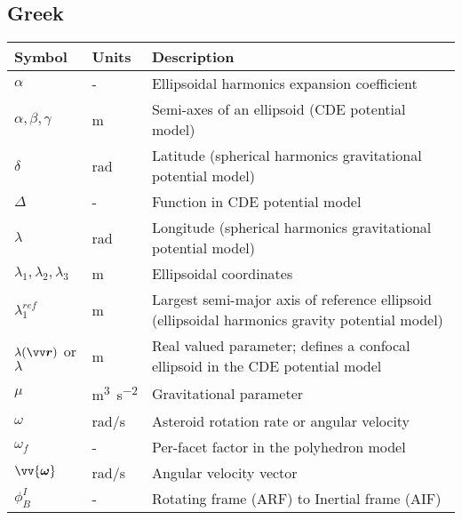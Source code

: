 \subsection*{Greek}
\begin{longtable}[l]{p{100pt} p{70pt} p{250pt}}
    \textbf{Symbol} & \textbf{Units} & \textbf{Description}                                 \\
    \hline
    $\alpha$            & -               & Ellipsoidal harmonics expansion coefficient     \\
    $\alpha, \beta, \gamma$ & m           & Semi-axes of an ellipsoid
                                            (CDE potential model)                           \\
    $\delta$            & rad             & Latitude (spherical harmonics
                                            gravitational potential model)                  \\
    $\Delta$            & -               & Function in CDE potential model                 \\
    $\lambda$           & rad             & Longitude (spherical harmonics
                                            gravitational potential model)                  \\
    $\lambda_1, \lambda_2, \lambda_3$ & m & Ellipsoidal coordinates                         \\
    $\lambda_1^{ref}$   & m               & Largest semi-major axis of reference ellipsoid
                                            (ellipsoidal harmonics gravity potential model) \\
    $\lambda(\bvector{r})$ or $\lambda$ & m & Real valued parameter; defines a confocal
                                              ellipsoid in the CDE potential model          \\
    $\mu$               & \si{\metre\cubed\per\second\squared}       & Gravitational parameter                         \\
    $\omega$            & rad/s           & Asteroid rotation rate or angular
                                            velocity                                        \\
    $\omega_f$          & -               & Per-facet factor in the polyhedron model        \\
    $\vv{\bm{\omega}}$  & rad/s           & Angular velocity vector                         \\
    $\phi_{B}^{I}$      & -               & Rotating frame (ARF) to Inertial frame (AIF)

\end{longtable}
